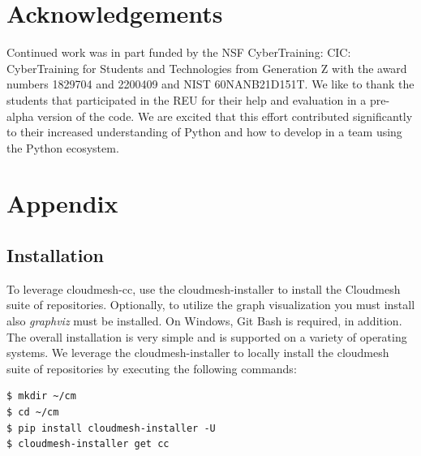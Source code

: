% 



\section*{Acknowledgements}

Continued work was in part funded by the NSF CyberTraining: CIC:
CyberTraining for Students and Technologies from Generation Z with the
award numbers 1829704 and 2200409 and NIST 60NANB21D151T. We like to
thank the students that participated in the REU for their help and
evaluation in a pre-alpha version of the code. We are excited that
this effort contributed significantly to their increased understanding
of Python and how to develop in a team using the Python ecosystem.








\appendix

\section{Appendix}

% 


\subsection{Installation}\label{installation}

To leverage cloudmesh-cc, use the cloudmesh-installer to install the
Cloudmesh suite of repositories. Optionally, to utilize the graph
visualization you must install also {\em graphviz} must be
installed. On Windows, Git Bash is required, in addition.  The overall
installation is very simple and is supported on a variety of operating
systems.  We leverage the cloudmesh-installer to locally install the
cloudmesh suite of repositories by executing the following commands:

\begin{verbatim}
$ mkdir ~/cm
$ cd ~/cm
$ pip install cloudmesh-installer -U
$ cloudmesh-installer get cc
\end{verbatim}

